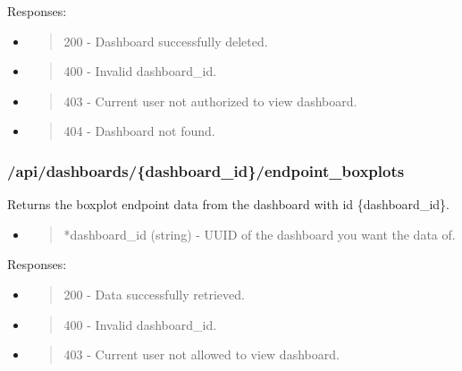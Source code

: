 Responses:

\begin{itemize}
\item
  \begin{quote}
  200 - Dashboard successfully deleted.
  \end{quote}
\item
  \begin{quote}
  400 - Invalid dashboard\_id.
  \end{quote}
\item
  \begin{quote}
  403 - Current user not authorized to view dashboard.
  \end{quote}
\item
  \begin{quote}
  404 - Dashboard not found.
  \end{quote}
\end{itemize}

\hypertarget{apidashboardsdashboard_idendpoint_boxplots}{%
\subsubsection{/api/dashboards/\{dashboard\_id\}/endpoint\_boxplots}\label{apidashboardsdashboard_idendpoint_boxplots}}

Returns the boxplot endpoint data from the dashboard with id
\{dashboard\_id\}.

\begin{itemize}
\item
  \begin{quote}
  *dashboard\_id (string) - UUID of the dashboard you want the data of.
  \end{quote}
\end{itemize}

Responses:

\begin{itemize}
\item
  \begin{quote}
  200 - Data successfully retrieved.
  \end{quote}
\item
  \begin{quote}
  400 - Invalid dashboard\_id.
  \end{quote}
\item
  \begin{quote}
  403 - Current user not allowed to view dashboard.
  \end{quote}
\end{itemize}

